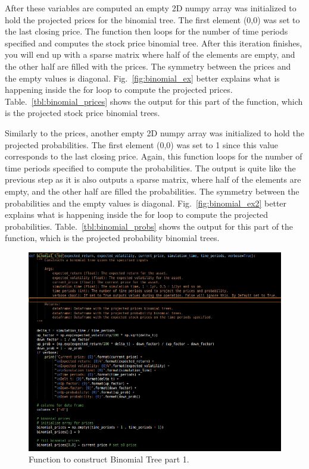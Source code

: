 \noindent
After these variables are computed an empty 2D numpy array was initialized to hold the projected prices for the binomial tree. The first element (0,0) was set to the last closing price.  The function then loops for the number of time periods specified and computes the stock price binomial tree. After this iteration finishes, you will end up with a sparse matrix where half of the elements are empty, and the other half are filled with the prices. The symmetry between the prices and the empty values is diagonal. Fig.~\ref{fig:binomial_ex} better explains what is happening inside the for loop to compute the projected prices. Table.~\ref{tbl:binomial_prices} shows the output for this part of the function, which is the projected stock price binomial trees. 

\noindent
Similarly to the prices, another empty 2D numpy array was initialized to hold the projected probabilities. The first element (0,0) was set to 1 since this value corresponds to the last closing price. Again, this function loops for the number of time periods specified to compute the probabilities. The output is quite like the previous step as it is also outputs a sparse matrix, where half of the elements are empty, and the other half are filled the probabilities. The symmetry between the probabilities and the empty values is diagonal. Fig.~\ref{fig:binomial_ex2} better explains what is happening inside the for loop to compute the projected probabilities. Table.~\ref{tbl:binomial_probs} shows the output for this part of the function, which is the projected probability binomial trees.

\begin{figure}[H]
\centering
  \includegraphics[scale = .62]{imgs/binomial_tree_1.png}
  \caption{Function to construct Binomial Tree part 1.}
  \label{fig:binomial_1}
\end{figure}

